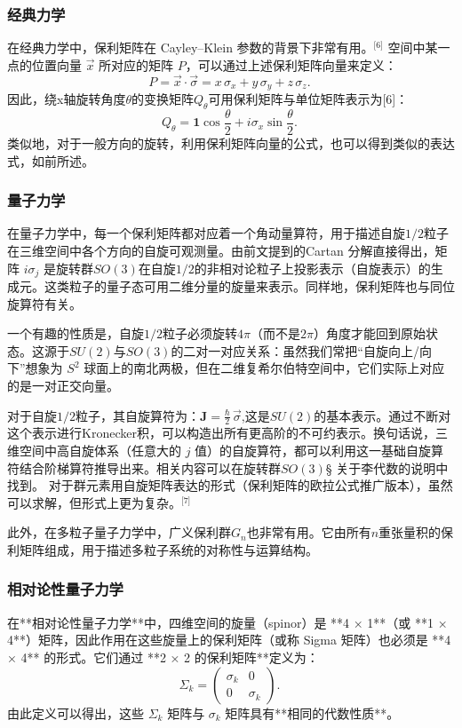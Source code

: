 \subsubsection{经典力学}
在经典力学中，保利矩阵在 Cayley–Klein 参数的背景下非常有用。\(^\text{[6]}\)
空间中某一点的位置向量 $\vec{x}$ 所对应的矩阵 $P$，可以通过上述保利矩阵向量来定义：
$$
P = \vec{x} \cdot \vec{\sigma} = x\,\sigma_x + y\,\sigma_y + z\,\sigma_z.~
$$
因此，绕x轴旋转角度$\theta$的变换矩阵$Q_\theta$可用保利矩阵与单位矩阵表示为[6]：
$$
Q_{\theta} = \mathbf{1} \cos{\frac{\theta}{2}} + i \sigma_x \sin{\frac{\theta}{2}}.~
$$
类似地，对于一般方向的旋转，利用保利矩阵向量的公式，也可以得到类似的表达式，如前所述。
\subsubsection{量子力学}
在量子力学中，每一个保利矩阵都对应着一个角动量算符，用于描述自旋$1/2$粒子在三维空间中各个方向的自旋可观测量。由前文提到的Cartan 分解直接得出，矩阵 $i\sigma_j$ 是旋转群$SO(3)$在自旋$1/2$的非相对论粒子上投影表示（自旋表示）的生成元。这类粒子的量子态可用二维分量的旋量来表示。同样地，保利矩阵也与同位旋算符有关。

一个有趣的性质是，自旋$1/2$粒子必须旋转$4\pi$（而不是$2\pi$）角度才能回到原始状态。这源于$SU(2)$与$SO(3)$的二对一对应关系：虽然我们常把“自旋向上/向下”想象为 $S^2$ 球面上的南北两极，但在二维复希尔伯特空间中，它们实际上对应的是一对正交向量。

对于自旋$1/2$粒子，其自旋算符为：$\mathbf{J} = \frac{\hbar}{2} \, \vec{\sigma}$,这是$SU(2)$的基本表示。通过不断对这个表示进行Kronecker积，可以构造出所有更高阶的不可约表示。换句话说，三维空间中高自旋体系（任意大的 $j$ 值）的自旋算符，都可以利用这一基础自旋算符结合阶梯算符推导出来。相关内容可以在旋转群$SO(3)$§ 关于李代数的说明中找到。
对于群元素用自旋矩阵表达的形式（保利矩阵的欧拉公式推广版本），虽然可以求解，但形式上更为复杂。\(^\text{[7]}\)

此外，在多粒子量子力学中，广义保利群$G_n$也非常有用。它由所有$n$重张量积的保利矩阵组成，用于描述多粒子系统的对称性与运算结构。
\subsubsection{相对论性量子力学}
在**相对论性量子力学**中，四维空间的旋量（spinor）是 **4 × 1**（或 **1 × 4**）矩阵，因此作用在这些旋量上的保利矩阵（或称 Sigma 矩阵）也必须是 **4 × 4** 的形式。它们通过 **2 × 2 的保利矩阵**定义为：
$$
\Sigma_k =
\begin{pmatrix}
\sigma_k & 0 \\
0 & \sigma_k
\end{pmatrix}.~
$$
由此定义可以得出，这些 $\Sigma_k$ 矩阵与 $\sigma_k$ 矩阵具有**相同的代数性质**。


